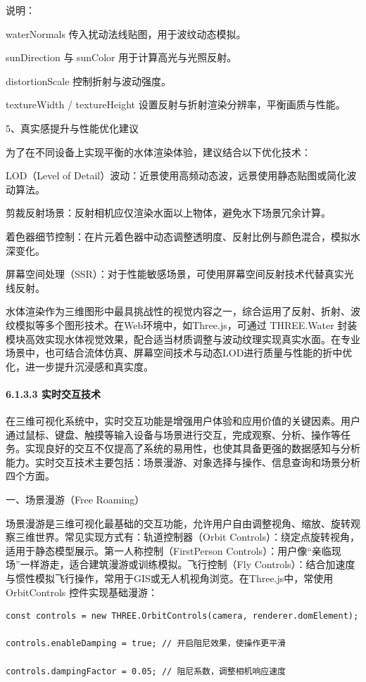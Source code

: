 说明：

waterNormals 传入扰动法线贴图，用于波纹动态模拟。

sunDirection 与 sunColor 用于计算高光与光照反射。

distortionScale 控制折射与波动强度。

textureWidth / textureHeight 设置反射与折射渲染分辨率，平衡画质与性能。

5、真实感提升与性能优化建议

为了在不同设备上实现平衡的水体渲染体验，建议结合以下优化技术：

LOD（Level of Detail）波动：近景使用高频动态波，远景使用静态贴图或简化波动算法。

剪裁反射场景：反射相机应仅渲染水面以上物体，避免水下场景冗余计算。

着色器细节控制：在片元着色器中动态调整透明度、反射比例与颜色混合，模拟水深变化。

屏幕空间处理（SSR）：对于性能敏感场景，可使用屏幕空间反射技术代替真实光线反射。

水体渲染作为三维图形中最具挑战性的视觉内容之一，综合运用了反射、折射、波纹模拟等多个图形技术。在Web环境中，如Three.js，可通过 THREE.Water 封装模块高效实现水体视觉效果，配合适当材质调整与波动纹理实现真实水面。在专业场景中，也可结合流体仿真、屏幕空间技术与动态LOD进行质量与性能的折中优化，进一步提升沉浸感和真实度。

\hypertarget{ux5b9eux65f6ux4ea4ux4e92ux6280ux672f}{%
\paragraph{6.1.3.3 实时交互技术}\label{ux5b9eux65f6ux4ea4ux4e92ux6280ux672f}}

在三维可视化系统中，实时交互功能是增强用户体验和应用价值的关键因素。用户通过鼠标、键盘、触摸等输入设备与场景进行交互，完成观察、分析、操作等任务。实现良好的交互不仅提高了系统的易用性，也使其具备更强的数据感知与分析能力。实时交互技术主要包括：场景漫游、对象选择与操作、信息查询和场景分析四个方面。

一、场景漫游（Free Roaming）

场景漫游是三维可视化最基础的交互功能，允许用户自由调整视角、缩放、旋转观察三维世界。常见实现方式有：轨道控制器（Orbit Controls）：绕定点旋转视角，适用于静态模型展示。第一人称控制（FirstPerson Controls）：用户像``亲临现场''一样游走，适合建筑漫游或训练模拟。飞行控制（Fly Controls）：结合加速度与惯性模拟飞行操作，常用于GIS或无人机视角浏览。在Three.js中，常使用 OrbitControls 控件实现基础漫游：

\begin{lstlisting}[style=javascript]
const controls = new THREE.OrbitControls(camera, renderer.domElement);

controls.enableDamping = true; // 开启阻尼效果，使操作更平滑

controls.dampingFactor = 0.05; // 阻尼系数，调整相机响应速度
\end{lstlisting}

